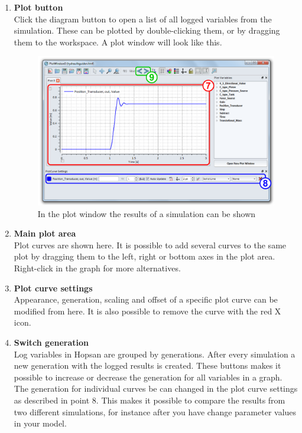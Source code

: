 \documentclass[a4paper,pdftex]{article}
\begin{document}
\begin{enumerate}
\item \textbf{Plot button} \\
Click the diagram button to open a list of all logged variables from the simulation.
These can be plotted by double-clicking them, or by dragging them to the workspace.
A plot window will look like this.

\begin{figure}[ht]
  \centering
  \includegraphics[width=\textwidth]{gfx/screenshot-plot.pdf}
  \caption{In the plot window the results of a simulation can be shown}
  \label{fig:hopsan_plotwindow}
\end{figure}

\item \textbf{Main plot area} \\
Plot curves are shown here.
It is possible to add several curves to the same plot by dragging them to the left, right or bottom axes in the plot area.
Right-click in the graph for more alternatives.

\item \textbf{Plot curve settings} \\
Appearance, generation, scaling and offset of a specific plot curve can be modified from here.
It is also possible to remove the curve with the red X icon.

\item \textbf{Switch generation} \\
Log variables in Hopsan are grouped by generations.
After every simulation a new generation with the logged results is created.
These buttons makes it possible to increase or decrease the generation for all variables in a graph.
The generation for individual curves be can changed in the plot curve settings as described in point 8.
This makes it possible to compare the results from two different simulations, for instance after you have change parameter values in your model.
 
\end{enumerate}
\end{document}
